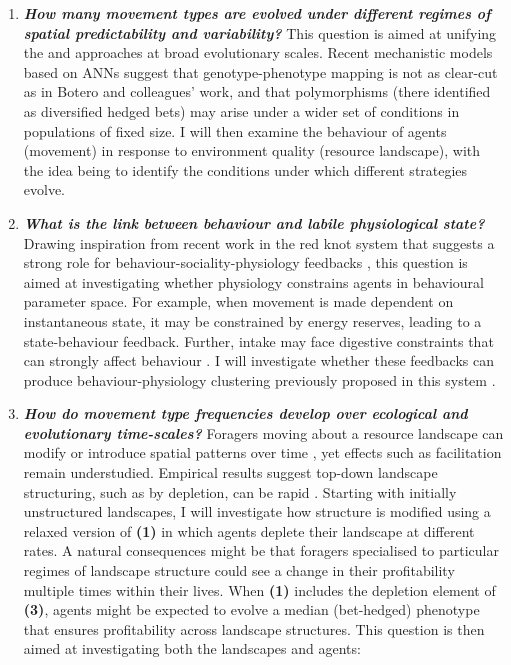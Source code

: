 \begin{enumerate}
\def\labelenumi{\arabic{enumi}.}
\item
  \textbf{\emph{How many movement types are evolved under different regimes of spatial predictability and variability?}} This question is aimed at unifying the \citet{wolf2010} and \citet{botero2015} approaches at broad evolutionary scales. Recent mechanistic models based on ANNs suggest that genotype-phenotype mapping is not as clear-cut as in Botero and colleagues' work, and that polymorphisms (there identified as diversified hedged bets) may arise under a wider set of conditions in populations of fixed size. I will then examine the behaviour of agents (movement) in response to environment quality (resource landscape), with the idea being to identify the conditions under which different strategies evolve.
\item
  \textbf{\emph{What is the link between behaviour and labile physiological state?}} Drawing inspiration from recent work in the red knot system that suggests a strong role for behaviour-sociality-physiology feedbacks \citetext{\citealp{bijleveld2014}; \citealp{mathot2017}; \citealp{oudman2016}; \citealp[discussed in][]{wolf2010}}, this question is aimed at investigating whether physiology constrains agents in behavioural parameter space. For example, when movement is made dependent on instantaneous state, it may be constrained by energy reserves, leading to a state-behaviour feedback. Further, intake may face digestive constraints that can strongly affect behaviour \citep{vangils2004}. I will investigate whether these feedbacks can produce behaviour-physiology clustering previously proposed in this system \citep{bijleveld2015b}.
\item
  \textbf{\emph{How do movement type frequencies develop over ecological and evolutionary time-scales?}} Foragers moving about a resource landscape can modify or introduce spatial patterns over time \citep{dejager2011, getz2015, netz2017}, yet effects such as facilitation remain understudied. Empirical results suggest top-down landscape structuring, such as by depletion, can be rapid \citep{bijleveld2015c}. Starting with initially unstructured landscapes, I will investigate how structure is modified using a relaxed version of \textbf{(1)} in which agents deplete their landscape at different rates. A natural consequences might be that foragers specialised to particular regimes of landscape structure could see a change in their profitability multiple times within their lives. When \textbf{(1)} includes the depletion element of \textbf{(3)}, agents might be expected to evolve a median (bet-hedged) phenotype that ensures profitability across landscape structures. This question is then aimed at investigating both the landscapes and agents:


\end{enumerate}
